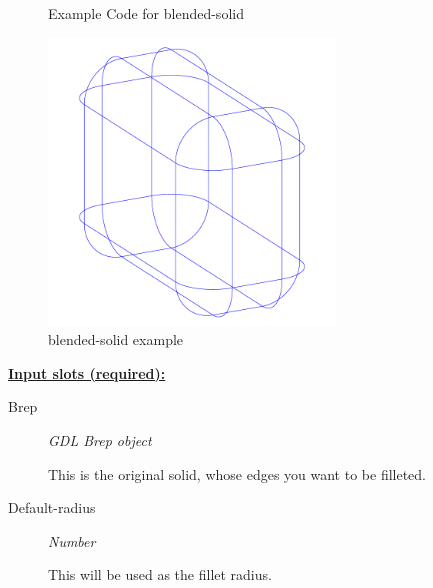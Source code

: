 \documentclass [11pt]{book}
\begin{document}
\begin{itemize}
\begin{figure}
\begin{lrbox}{\boxedverb}
\begin{minipage}{\linewidth}
{\begin{verbatim}
\end{verbatim}}
\end{minipage}
\end{lrbox}
\fbox{\usebox{\boxedverb}}

\caption{Example Code for blended-solid}

\label{fig:example-code-blended-solid}

\end{figure}

\begin{figure}
\begin{center}
\includegraphics[width=3in,height=3in]{../images/example-blended-solid.pdf}
\end{center}

\caption{blended-solid example}

\label{fig:blended-solid}

\end{figure}





\textbf{
\underline{Input slots (required):}}

\begin{description}

\item [Brep]
\emph{GDL Brep object}

 This is the original solid, whose edges you want to be filleted.




\item [Default-radius]
\emph{Number}

 This will be used as the fillet radius.




\end{description}







\end{itemize}
\end{document}
